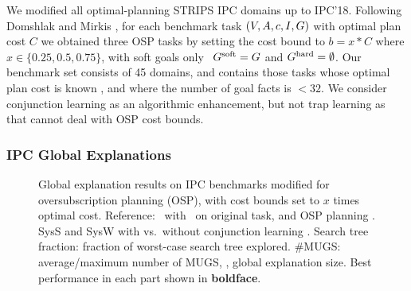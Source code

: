 We modified all optimal-planning STRIPS IPC domains up to
IPC'18. Following Domshlak and
Mirkis , for each benchmark task
$(V,A,{c},I,G)$ with optimal plan cost $C$ we
obtained three OSP tasks by setting the cost bound to $b = x * C$
where $x \in \{0.25, 0.5, 0.75\}$, with soft goals only \ie\
$G^{\text{\textup{soft}}} = G$ and $G^{\text{\textup{hard}}}=\emptyset$. Our benchmark set
consists of 45 domains, and contains those tasks whose optimal plan
cost is known \joerg{add cite/reference}, and where the number of goal
facts is $< 32$.
%
%
%
%
We consider conjunction learning as an algorithmic enhancement, but
not trap learning as that cannot deal with OSP cost bounds.
%


\subsubsection{IPC Global Explanations}

\setlength{\tabcolsep}{2pt}
\renewcommand{\arraystretch}{0.8}
\begin{figure*}[h!]
\tiny
%
\centering  
%
\vspace{-0.2cm}
\caption{\label{table:coverage_ipc} Global explanation results on IPC benchmarks modified 
for oversubscription planning (OSP), with cost bounds set to $x$ times
optimal cost. Reference: \astar\ with \hlmcut\ on original task, and
OSP planning \cite{katz:etal:icaps-19}. SysS and SysW with vs.\
without conjunction learning \hc. Search tree fraction: fraction of
worst-case search tree explored. \#MUGS: average/maximum number of
MUGS, \ie, global explanation size. Best performance in each part
shown in \textbf{boldface}.}
\vspace{-0.5cm}
\end{figure*}

